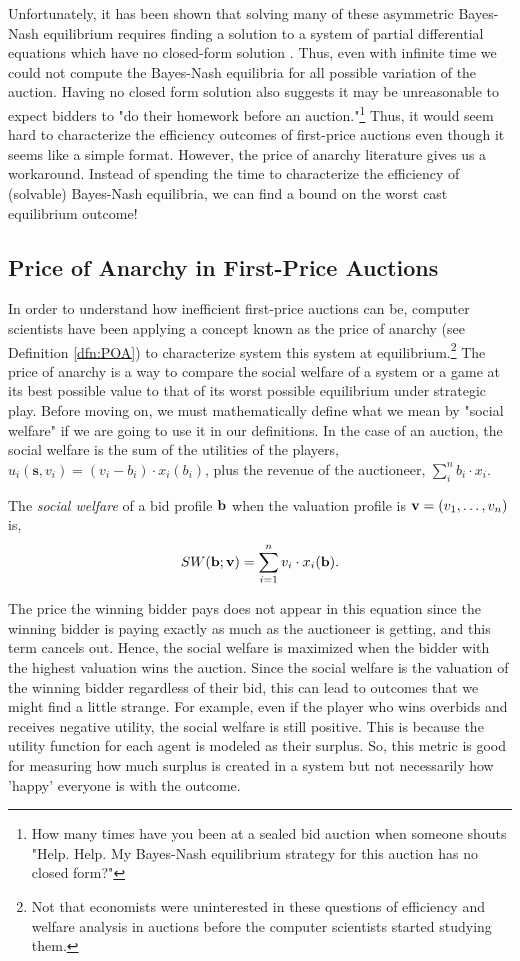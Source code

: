 \documentclass[12pt,twoside]{reedthesis}
\begin{document}
 Unfortunately, it has been shown that solving many of these asymmetric Bayes-Nash equilibrium requires finding a solution to a system of partial differential equations which have no closed-form solution \citep{Roughgarden2017}. Thus, even with infinite time we could not compute the Bayes-Nash equilibria for all possible variation of the auction. Having no closed form solution also suggests it may be unreasonable to expect bidders to "do their homework before an auction."\footnote{How many times have you been at a sealed bid auction when someone shouts "Help. Help. My Bayes-Nash equilibrium strategy for this auction has no closed form?"} Thus, it would seem hard to characterize the efficiency outcomes of first-price auctions even though it seems like a simple format. However, the price of anarchy literature gives us a workaround. Instead of spending the time to characterize the efficiency of (solvable) Bayes-Nash equilibria, we can find a bound on the worst cast equilibrium outcome!
\label{sec:knownBayes}
\subsection{Price of Anarchy in First-Price Auctions} 
In order to understand how inefficient first-price auctions can be, computer scientists have been applying a concept known as the price of anarchy (see Definition \ref{dfn:POA}) to characterize system this system at equilibrium.\footnote{Not that economists were uninterested in these questions of efficiency and welfare analysis in auctions before the computer scientists started studying them.} The price of anarchy is a way to compare the social welfare of a system or a game at its best possible value to that of its worst possible equilibrium under strategic play. Before moving on, we must mathematically define what we mean by "social welfare" if we are going to use it in our definitions. In the case of an auction, the social welfare is the sum of the utilities of the players, $u_i(\textbf{s}, v_i) = (v_i - b_i) \cdot x_i(b_i)$, plus the revenue of the auctioneer, $\sum_{i}^{n} b_i \cdot x_i$. 

\begin{dfn}
	The \textit{social welfare} of a bid profile $\textbf{b}$ when the valuation profile is $\textbf{v} = (v_1, \ldots, v_n)$ is, 
	$$ SW(\textbf{b};\textbf{v}) = \sum_{i=1}^{n} v_i \cdot x_i (\textbf{b}).$$
	\label{dfn:SocialWelfare}
\end{dfn}

The price the winning bidder pays does not appear in this equation since the winning bidder is paying exactly as much as the auctioneer is getting, and this term cancels out. Hence, the social welfare is maximized when the bidder with the highest valuation wins the auction. Since the social welfare is the valuation of the winning bidder regardless of their bid, this can lead to outcomes that we might find a little strange. For example, even if the player who wins overbids and receives negative utility, the social welfare is still positive. This is because the utility function for each agent is modeled as their surplus. So, this metric is good for measuring how much surplus is created in a system but not necessarily how 'happy' everyone is with the outcome. 
\end{document}
